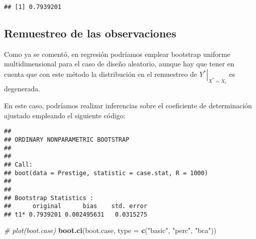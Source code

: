 \documentclass[]{book}
\newenvironment{Shaded}{\begin{snugshade}}{\end{snugshade}}
\newcommand{\KeywordTok}[1]{\textcolor[rgb]{0.13,0.29,0.53}{\textbf{#1}}}
\newcommand{\DataTypeTok}[1]{\textcolor[rgb]{0.13,0.29,0.53}{#1}}
\newcommand{\DecValTok}[1]{\textcolor[rgb]{0.00,0.00,0.81}{#1}}
\newcommand{\StringTok}[1]{\textcolor[rgb]{0.31,0.60,0.02}{#1}}
\newcommand{\CommentTok}[1]{\textcolor[rgb]{0.56,0.35,0.01}{\textit{#1}}}
\newcommand{\ControlFlowTok}[1]{\textcolor[rgb]{0.13,0.29,0.53}{\textbf{#1}}}
\newcommand{\OperatorTok}[1]{\textcolor[rgb]{0.81,0.36,0.00}{\textbf{#1}}}
\newcommand{\NormalTok}[1]{#1}
\theoremstyle{break}
\theoremstyle{definition}
\theoremstyle{definition}
\theoremstyle{definition}
\theoremstyle{remark}
\begin{document}
\begin{verbatim}
## [1] 0.7939201
\end{verbatim}

\subsection{Remuestreo de las observaciones}\label{boot-unif-reg}

Como ya se comentó, en regresión podríamos emplear bootstrap uniforme
multidimensional para el caso de diseño aleatorio, aunque hay que tener
en cuenta que con este método la distribución en el remuestreo de
\(\left. Y^{\ast}\right\vert _{X^{\ast}=X_i}\) es degenerada.

En este caso, podríamos realizar inferencias sobre el coeficiente de
determinación ajustado empleando el siguiente código:

\begin{Shaded}
\end{Shaded}

\begin{verbatim}
## 
## ORDINARY NONPARAMETRIC BOOTSTRAP
## 
## 
## Call:
## boot(data = Prestige, statistic = case.stat, R = 1000)
## 
## 
## Bootstrap Statistics :
##      original      bias    std. error
## t1* 0.7939201 0.002495631   0.0315275
\end{verbatim}

\begin{Shaded}
\begin{Highlighting}[]
\CommentTok{# plot(boot.case)}
\KeywordTok{boot.ci}\NormalTok{(boot.case, }\DataTypeTok{type =} \KeywordTok{c}\NormalTok{(}\StringTok{"basic"}\NormalTok{, }\StringTok{"perc"}\NormalTok{, }\StringTok{"bca"}\NormalTok{))}
\end{Highlighting}
\end{Shaded}
\end{document}
